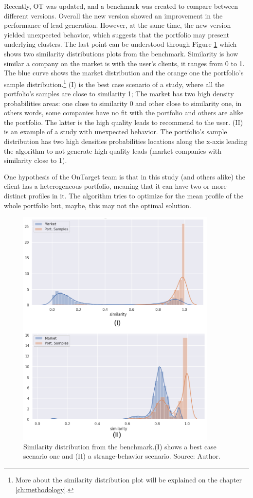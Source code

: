 Recently, OT was updated, and a benchmark was created to compare between different versions. Overall the new version showed an improvement in the performance of lead generation. However, at the same time, the new version yielded unexpected behavior, which suggests that the portfolio may present underlying clusters. The last point can be understood through Figure \ref{fig:simi-dist-expected-real} which shows two similarity distributions plots from the benchmark. Similarity is how similar a company on the market is with the user's clients, it ranges from 0 to 1. The blue curve shows the market distribution and the orange one the portfolio's sample distribution.\footnote{More about the similarity distribution plot will be explained on the chapter \ref{ch:methodology}.}
(I) is the best case scenario of a study, where all the portfolio's samples are close to similarity 1; The market has two high density probabilities areas: one close to similarity 0 and other close to similarity one, in others words, some companies have no fit with the portfolio and others are alike the portfolio. The latter is the high quality leads to recommend to the user. (II) is an example of a study with unexpected behavior. The portfolio's sample distribution has two high densities probabilities locations along the x-axis leading the algorithm to not generate high quality leads (market companies with similarity close to 1).

One hypothesis of the OnTarget team is that in this study (and others alike) the client has a heterogeneous portfolio, meaning that it can have two or more distinct profiles in it. The algorithm tries to optimize for the mean profile of the whole portfolio but, maybe, this may not the optimal solution.

\begin{figure}
   \centering
   \includegraphics[width=10cm]{fig/int-simi-dist-expected-real.png} 
   \caption{Similarity distribution from the benchmark.(I) shows a best case scenario one and (II) a strange-behavior scenario. Source: Author.}
   \label{fig:simi-dist-expected-real}
\end{figure}

